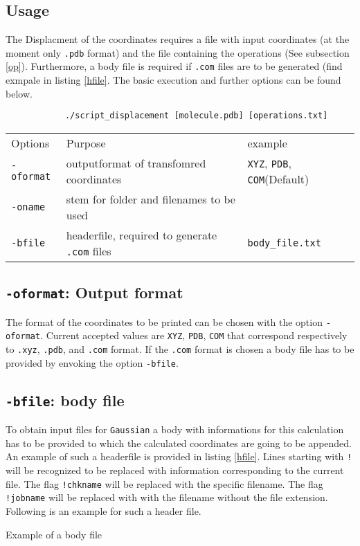 \documentclass[parskip]{scrartcl}
\begin{document}
    \subsection{Usage}
        The Displacment of the coordinates requires a file with input coordinates 
        (at the moment only \texttt{.pdb} format) 
        and the file containing the operations (See subsection \ref{op}).
        Furthermore, a body file is required
        if \texttt{.com} files are to be generated (find exmpale in listing \ref{hfile}.
        The basic execution and further options can be found below.
        \begin{verbatim}
            ./script_displacement [molecule.pdb] [operations.txt]
        \end{verbatim}
            \begin{tabular}{lll}
                Options & Purpose & example
                \\\texttt{-oformat}     & outputformat of transfomred coordinates
                & \texttt{XYZ}, \texttt{PDB}, \texttt{COM}(Default)
                \\\texttt{-oname}         & stem for folder and filenames to be used
                & \texttt{}
                \\\texttt{-bfile}       & headerfile, required to generate \texttt{.com} files
                & \texttt{body\_file.txt}
            \end{tabular}

    \subsection{\texttt{-oformat}: Output format}
    The format of the coordinates to be printed can be chosen with the option \texttt{-oformat}.
    Current accepted values are \texttt{XYZ}, \texttt{PDB}, \texttt{COM} that correspond
    respectively to \texttt{.xyz}, \texttt{.pdb}, and \texttt{.com} format.
    If the \texttt{.com} format is chosen a body file has to be provided by envoking the option
    \texttt{-bfile}. 

    \subsection{\texttt{-bfile}: body file}
    To obtain input files for \texttt{Gaussian} a body with informations for this calculation has to
    be provided to which the calculated coordinates are going to be appended.
    An example of such a headerfile is provided in listing \ref{hfile}.
    Lines starting with \texttt{!} will be recognized to be replaced with information corresponding
    to the current file. The flag \texttt{!chkname} will be replaced with the specific filename.
    The flag \texttt{!jobname} will be replaced with with the filename without the file extension.
    Following is an example for such a header file.
    \begin{listing}
    \caption{Example of a body file\label{hfile}}
    \inputminted{text}{listing_sources/header_file.txt}
    \end{listing}
\end{document}
